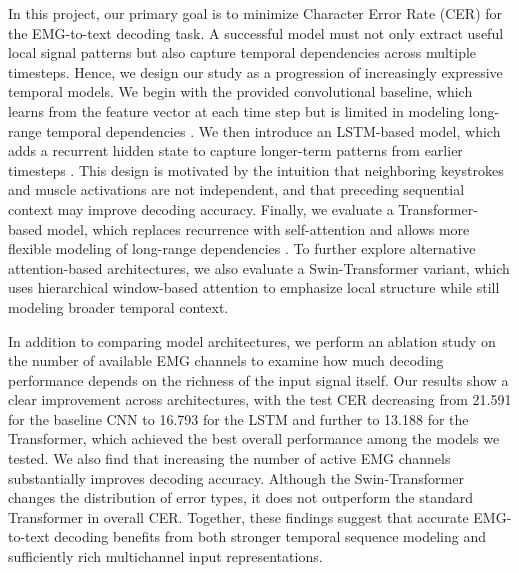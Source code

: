 \documentclass{article}
\begin{document}
In this project, our primary goal is to minimize Character Error Rate (CER) for the EMG-to-text decoding task. A successful model must not only extract useful local signal patterns but also capture temporal dependencies across multiple timesteps. Hence, we design our study as a progression of increasingly expressive temporal models. We begin with the provided convolutional baseline, which learns from the feature vector at each time step but is limited in modeling long-range temporal dependencies \cite{emg2qwerty_neurips2024}. We then introduce an LSTM-based model, which adds a recurrent hidden state to capture longer-term patterns from earlier timesteps \cite{6795963}. This design is motivated by the intuition that neighboring keystrokes and muscle activations are not independent, and that preceding sequential context may improve decoding accuracy. Finally, we evaluate a Transformer-based model, which replaces recurrence with self-attention and allows more flexible modeling of long-range dependencies \cite{vaswani2017attention}. To further explore alternative attention-based architectures, we also evaluate a Swin-Transformer variant, which uses hierarchical window-based attention to emphasize local structure while still modeling broader temporal context.

In addition to comparing model architectures, we perform an ablation study on the number of available EMG channels to examine how much decoding performance depends on the richness of the input signal itself. Our results show a clear improvement across architectures, with the test CER decreasing from 21.591 for the baseline CNN to 16.793 for the LSTM and further to 13.188 for the Transformer, which achieved the best overall performance among the models we tested. We also find that increasing the number of active EMG channels substantially improves decoding accuracy. Although the Swin-Transformer changes the distribution of error types, it does not outperform the standard Transformer in overall CER. Together, these findings suggest that accurate EMG-to-text decoding benefits from both stronger temporal sequence modeling and sufficiently rich multichannel input representations.



\end{document}
